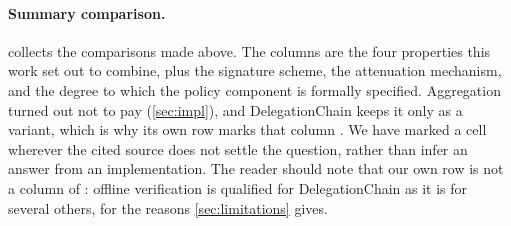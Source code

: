 \documentclass[11pt,a4paper]{article}
\begin{document}
\paragraph{Summary comparison.}
 collects the comparisons made above. The columns
are the four properties this work set out to combine, plus the
signature scheme, the attenuation mechanism, and the degree to which the
policy component is formally specified. Aggregation turned out not to
pay (\cref{sec:impl}), and DelegationChain keeps it only as a variant,
which is why its own row marks that column \tpart. We have marked a cell \tunspec{} wherever the cited source
does not settle the question, rather than infer an answer from an
implementation. The reader should note that our own row is not a column
of \tyes: offline verification is qualified for DelegationChain as it is
for several others, for the reasons \cref{sec:limitations} gives.
\end{document}
